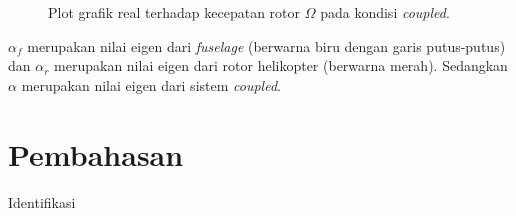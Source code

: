 \begin{figure}[h]
	\centering
	\caption{Plot grafik real terhadap kecepatan rotor $\Omega$ pada kondisi \textit{coupled}.}
	\label{fig:real(coupled)}
\end{figure}

$\alpha_f$ merupakan nilai eigen dari \textit{fuselage} (berwarna biru dengan garis putus-putus) dan $\alpha_r$ merupakan nilai eigen dari rotor helikopter (berwarna merah). Sedangkan $\alpha$ merupakan nilai eigen dari sistem \textit{coupled}.

\section{Pembahasan}
\label{sec:pembahasan}



Identifikasi 